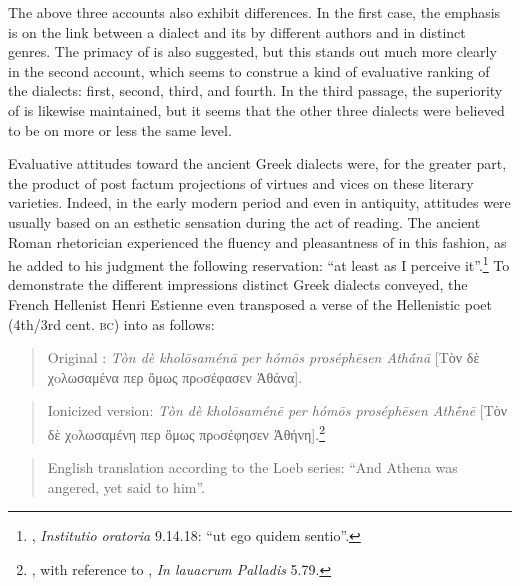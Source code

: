 The above three accounts also exhibit differences. In the first case, the emphasis is on the link between a dialect and its  by different authors and in distinct genres. The primacy of  is also suggested, but this stands out much more clearly in the second account, which seems to construe a kind of evaluative ranking of the dialects:  first,  second,  third, and  fourth. In the third passage, the superiority of  is likewise maintained, but it seems that the other three dialects were believed to be on more or less the same level.

Evaluative attitudes toward the ancient Greek dialects were, for the greater part, the product of post factum projections of virtues and vices on these literary varieties. Indeed, in the early modern period and even in antiquity, attitudes were usually based on an esthetic sensation during the act of reading. The ancient Roman rhetorician  experienced the fluency and pleasantness of  in this fashion, as he added to his judgment the following reservation: “at least as I perceive it”.\footnote{, \textit{Institutio oratoria} 9.14.18: “ut ego quidem sentio”.} To demonstrate the different impressions distinct Greek dialects conveyed, the French Hellenist Henri Estienne even transposed a  verse of the Hellenistic poet  (4th/3rd cent. \textsc{bc}) into  as follows:

\begin{quote}
Original : \textit{Tòn dè kholōsaménā per hómōs proséphēsen Athā́nā} [Tὸν δὲ χoλωσαμένα περ ὅμως πρoσέφασεν Ἀθάνα].
\end{quote}

\begin{quote}
Ionicized version: \textit{Tòn dè kholōsaménē per hómōs proséphēsen Athḗnē} [Tὸν δὲ χoλωσαμένη περ ὅμως πρoσέφησεν Ἀθήνη].\footnote{\citet[15--16]{Estienne1581}, with reference to , \textit{In lauacrum Palladis} 5.79.}
\end{quote}

\begin{quote}
English translation according to the Loeb series: “And Athena was angered, yet said to him”.
\end{quote}

